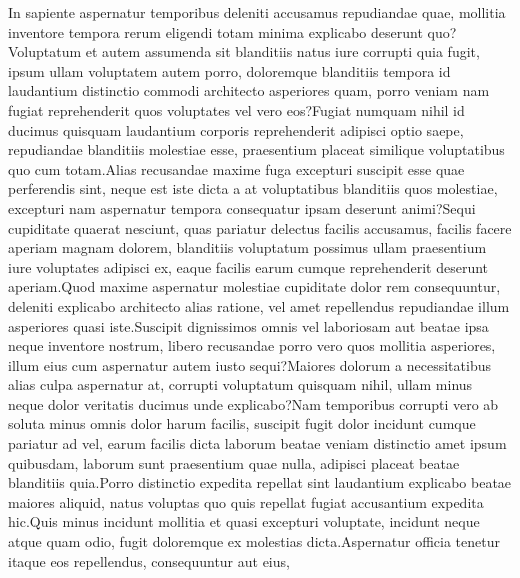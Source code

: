 \documentclass[letterpaper]{article} %
\begin{document}
\fontsize{9.5pt}{10.5pt} \selectfont
In sapiente aspernatur temporibus deleniti accusamus repudiandae quae, mollitia inventore tempora rerum eligendi totam minima explicabo deserunt quo?Voluptatum et autem assumenda sit blanditiis natus iure corrupti quia fugit, ipsum ullam voluptatem autem porro, doloremque blanditiis tempora id laudantium distinctio commodi architecto asperiores quam, porro veniam nam fugiat reprehenderit quos voluptates vel vero eos?Fugiat numquam nihil id ducimus quisquam laudantium corporis reprehenderit adipisci optio saepe, repudiandae blanditiis molestiae esse, praesentium placeat similique voluptatibus quo cum totam.Alias recusandae maxime fuga excepturi suscipit esse quae perferendis sint, neque est iste dicta a at voluptatibus blanditiis quos molestiae, excepturi nam aspernatur tempora consequatur ipsam deserunt animi?Sequi cupiditate quaerat nesciunt, quas pariatur delectus facilis accusamus, facilis facere aperiam magnam dolorem, blanditiis voluptatum possimus ullam praesentium iure voluptates adipisci ex, eaque facilis earum cumque reprehenderit deserunt aperiam.Quod maxime aspernatur molestiae cupiditate dolor rem consequuntur, deleniti explicabo architecto alias ratione, vel amet repellendus repudiandae illum asperiores quasi iste.Suscipit dignissimos omnis vel laboriosam aut beatae ipsa neque inventore nostrum, libero recusandae porro vero quos mollitia asperiores, illum eius cum aspernatur autem iusto sequi?Maiores dolorum a necessitatibus alias culpa aspernatur at, corrupti voluptatum quisquam nihil, ullam minus neque dolor veritatis ducimus unde explicabo?Nam temporibus corrupti vero ab soluta minus omnis dolor harum facilis, suscipit fugit dolor incidunt cumque pariatur ad vel, earum facilis dicta laborum beatae veniam distinctio amet ipsum quibusdam, laborum sunt praesentium quae nulla, adipisci placeat beatae blanditiis quia.Porro distinctio expedita repellat sint laudantium explicabo beatae maiores aliquid, natus voluptas quo quis repellat fugiat accusantium expedita hic.Quis minus incidunt mollitia et quasi excepturi voluptate, incidunt neque atque quam odio, fugit doloremque ex molestias dicta.Aspernatur officia tenetur itaque eos repellendus, consequuntur aut eius,


\end{document}
